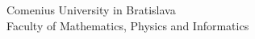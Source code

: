 
\begin{center}
    \sc\large
    Comenius University in Bratislava\\
    Faculty of Mathematics, Physics and Informatics

    \vfill

    {\LARGE\thesisTitle}\\
    \thesisType
\end{center}

\vfill

{
    \sc\large
    \noindent \thesisYear\\
    \thesisAuthor
}
